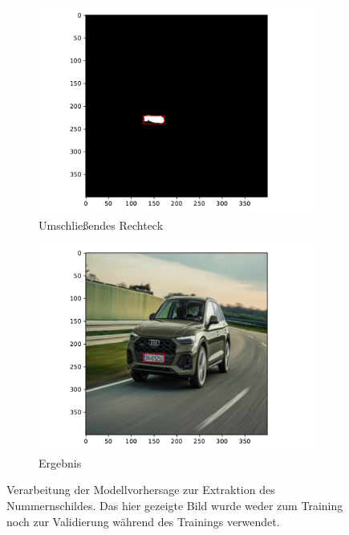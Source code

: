 \begin{figure}
\begin{subfigure}{0.495\textwidth}
        \includegraphics[width=\textwidth]{abbildungen/verarbeitung_3}
        \caption{Umschlie{\ss}endes Rechteck}
    \end{subfigure}
    \begin{subfigure}{0.495\textwidth}
        \centering
        \includegraphics[width=\textwidth]{abbildungen/verarbeitung_4}
        \caption{Ergebnis}
    \end{subfigure}
    \caption{Verarbeitung der Modellvorhersage zur Extraktion des
        Nummernschildes. Das hier gezeigte Bild wurde weder zum Training
        noch zur Validierung w\"ahrend des Trainings verwendet.}
    \label{fig:verarbeitung}
\end{figure}

